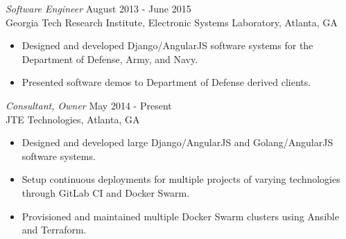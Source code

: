\documentclass[margin, 10pt]{res} %
\begin{document}
\begin{resume}
{\sl Software Engineer} \hfill August 2013 - June 2015 \\
Georgia Tech Research Institute, Electronic Systems Laboratory, Atlanta, GA 
\begin{itemize} \itemsep -2pt %
\item Designed and developed Django/AngularJS software systems for the Department of Defense, Army, and Navy.
\item Presented software demos to Department of Defense derived clients.
\end{itemize}
 
{\sl Consultant, Owner} \hfill May 2014 - Present\\
JTE Technologies, Atlanta, GA
\begin{itemize} 
\item Designed and developed large Django/AngularJS and Golang/AngularJS software systems.
\item Setup continuous deployments for multiple projects of varying technologies through GitLab CI and Docker Swarm.
\item Provisioned and maintained multiple Docker Swarm clusters using Ansible and Terraform.
\end{itemize} 

\end{resume}
\end{document}
